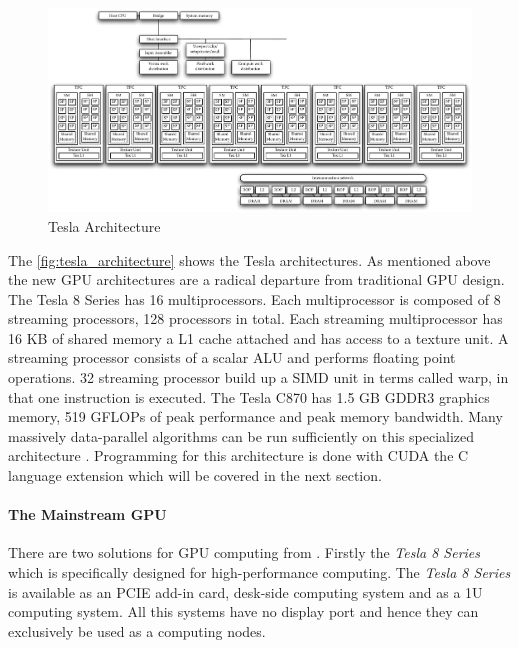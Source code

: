 \begin{figure}[ht]
\centering
\includegraphics[width=\textwidth]{gfx/tesla_architecture} 
\caption{Tesla Architecture} 
\label{fig:tesla_architecture} 
\end{figure} 

The \autoref{fig:tesla_architecture} shows the Tesla architectures. As mentioned
above the new \gls{GPU} architectures are a radical departure from traditional
\gls{GPU} design. The Tesla 8 Series has 16 multiprocessors. Each multiprocessor
is composed of 8 streaming processors, 128 processors in total. Each streaming
multiprocessor has 16 \gls{KB} of shared memory a L1 cache attached and has access
to a texture unit. A streaming processor consists of a scalar \gls{ALU} and
performs floating point operations. 32 streaming processor build up a \gls{SIMD}
unit in {} terms called warp, in that one instruction is executed. The Tesla
C870 has 1.5 \gls{GB} \gls{GDDR3} graphics memory, 519 \glspl{GFLOP} of peak
performance and  peak memory bandwidth. Many massively
data-parallel algorithms can be run sufficiently on this specialized
architecture \citep{citeulike:3145468}. Programming for this architecture is
done with \gls{CUDA} the C language extension which will be covered in the next
section.


\paragraph{The Mainstream GPU} %
\label{par:the_mainstream_gpu}
There are two solutions for \gls{GPU} computing from {}. Firstly the
\emph{Tesla 8 Series} which is specifically designed for high-performance
computing. The \emph{Tesla 8 Series} is available as an \gls{PCIE} add-in card,
desk-side computing system and as a \gls{1U} computing system. All this systems have
no display port and hence they can exclusively be used as a computing nodes. 


